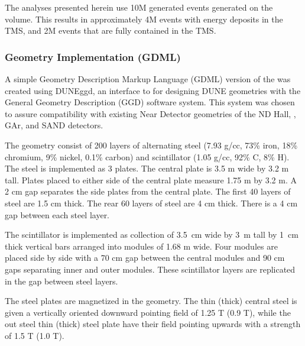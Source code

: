 The analyses presented herein use 10M generated events generated on the  volume. This results in approximately 4M events with energy deposits in the TMS, and 2M events that are fully contained in the TMS. 

\subsubsection{Geometry Implementation (GDML)}
A simple Geometry Description Markup Language (GDML) version of the  was created using DUNEggd, an interface to for designing DUNE geometries with the General Geometry Description (GGD) software system. This system was chosen to assure compatibility with existing Near Detector geometries of the ND Hall, , GAr, and SAND detectors. 

The geometry consist of 200 layers of alternating steel (7.93 g/cc, 73\% iron, 18\% chromium, 9\% nickel, 0.1\% carbon) and scintillator (1.05 g/cc, 92\% C, 8\% H). The steel is implemented as 3 plates. The central plate is 3.5 m wide by 3.2 m tall. Plates placed to either side of the central plate measure 1.75 m by 3.2 m. A 2 cm gap separates the side plates from the central plate. The first 40 layers of steel are 1.5 cm thick. The rear 60 layers of steel are 4 cm thick. There is a 4 cm gap between each steel layer. 

The scintillator is implemented as collection of 3.5~cm wide by 3~m tall by 1~cm thick vertical bars arranged into modules of 1.68 m wide. Four modules are placed side by side with a 70 cm gap between the central modules and 90 cm gaps separating inner and outer modules. These scintillator layers are replicated in the gap between steel layers.  

The steel plates are magnetized in the geometry. The thin (thick) central steel is given a vertically oriented downward pointing field of 1.25 T (0.9 T), while the out steel thin (thick) steel plate have their field pointing upwards with a strength of 1.5 T (1.0 T).

